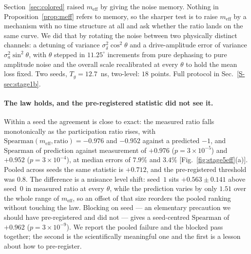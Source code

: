 \documentclass[aps,pra,twocolumn,superscriptaddress,reprint,nofootinbib,floatfix]{revtex4-2}
\theoremstyle{definition}
\newcommand{\sref}[1]{Sec.~\ref{S-#1}}
\begin{document}
Section~\ref{sec:colored} raised $m_{\mathrm{eff}}$ by giving the noise
memory. Nothing in Proposition~\ref{prop:meff} refers to memory, so the
sharper test is to raise $m_{\mathrm{eff}}$ by a mechanism with no time
structure at all and ask whether the ratio lands on the same curve. We did
that by rotating the noise between two physically distinct channels: a
detuning of variance $\sigma_\delta^2\cos^2\theta$ and a drive-amplitude
error of variance $\sigma_a^2\sin^2\theta$, with $\theta$ stepped in
$11.25^\circ$ increments from pure dephasing to pure amplitude noise and the
overall scale recalibrated at every $\theta$ to hold the mean loss fixed. Two
seeds, $T_g=12.7$~ns, two-level: $18$ points. Full protocol in
\sref{sec:stage1b}.

\paragraph*{The law holds, and the pre-registered statistic did not see it.}
Within a seed the agreement is close to exact: the measured ratio falls
monotonically as the participation ratio rises, with
$\mathrm{Spearman}(m_{\mathrm{eff}},\text{ratio})=-0.976$ and $-0.952$
against a predicted $-1$, and $\mathrm{Spearman}$ of prediction against
measurement of $+0.976$ ($p=3\times10^{-5}$) and $+0.952$
($p=3\times10^{-4}$), at median errors of $7.9\%$ and $3.4\%$
[Fig.~\ref{fig:stage5eff}(a)]. Pooled across seeds the same statistic is
$+0.712$, and the pre-registered threshold was $0.8$. The difference is a
nuisance level shift: seed~$1$ sits $+0.563\pm0.141$ above seed~$0$ in
measured ratio at every $\theta$, while the prediction varies by only $1.51$
over the whole range of $m_{\mathrm{eff}}$, so an offset of that size
reorders the pooled ranking without touching the law. Blocking on seed --- an
elementary precaution we should have pre-registered and did not --- gives a
seed-centred $\mathrm{Spearman}$ of $+0.962$ ($p=3\times10^{-9}$). We report
the pooled failure and the blocked pass together; the second is the
scientifically meaningful one and the first is a lesson about how to
pre-register.
\end{document}
